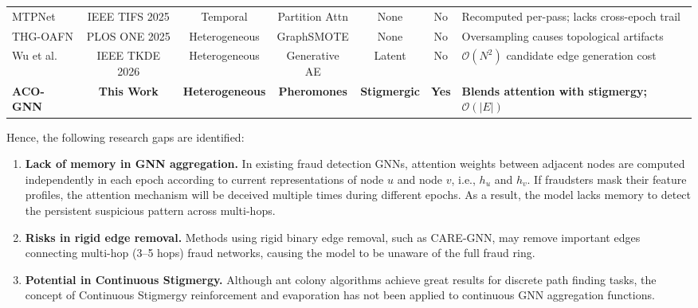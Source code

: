 \begin{table}[htb]
\begin{tabularx}{\textwidth}{@{}l c c c c c >{\raggedright\arraybackslash}X@{}}
MTPNet \cite{mtpnet2025} & IEEE TIFS 2025 & Temporal & Partition Attn & None & No & Recomputed per-pass; lacks cross-epoch trail \\
THG-OAFN \cite{wei2025internet} & PLOS ONE 2025 & Heterogeneous & GraphSMOTE & None & No & Oversampling causes topological artifacts \\
Wu et al. \cite{wu2026defending} & IEEE TKDE 2026 & Heterogeneous & Generative AE & Latent & No & $\mathcal{O}(N^2)$ candidate edge generation cost \\
\midrule
\textbf{ACO-GNN} & \textbf{This Work} & \textbf{Heterogeneous} & \textbf{Pheromones} & \textbf{Stigmergic} & \textbf{Yes} & \textbf{Blends attention with stigmergy; $\mathcal{O}(|E|)$} \\
\bottomrule
\end{tabularx}
\end{table}

Hence, the following research gaps are identified:
\begin{enumerate}
    \item \textbf{Lack of memory in GNN aggregation.} In existing fraud detection GNNs, attention weights between adjacent nodes are computed independently in each epoch according to current representations of node $u$ and node $v$, i.e., $h_u$ and $h_v$. If fraudsters mask their feature profiles, the attention mechanism will be deceived multiple times during different epochs. As a result, the model lacks memory to detect the persistent suspicious pattern across multi-hops.
    \item \textbf{Risks in rigid edge removal.} Methods using rigid binary edge removal, such as CARE-GNN, may remove important edges connecting multi-hop (3--5 hops) fraud networks, causing the model to be unaware of the full fraud ring.
    \item \textbf{Potential in Continuous Stigmergy.} Although ant colony algorithms achieve great results for discrete path finding tasks, the concept of Continuous Stigmergy reinforcement and evaporation has not been applied to continuous GNN aggregation functions.
\end{enumerate}
